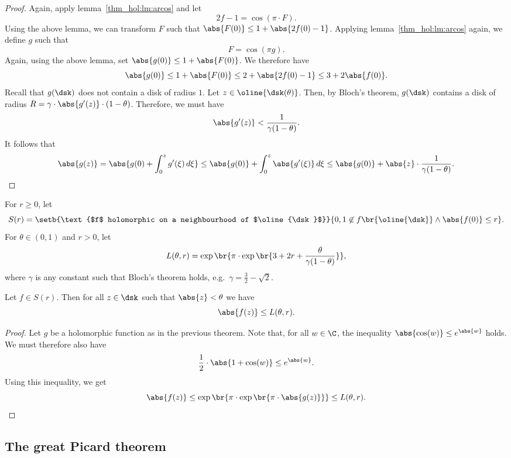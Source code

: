 \begin{proof}
Again, apply lemma~\ref{thm_hol:lm:arcos} and let
\[
2f - 1 = \cos(\pi \cdot F).
\]
Using the above lemma, we can transform $F$ such that
$\abs{F(0)} \leq 1 + \abs{2f(0) - 1}$. Applying
lemma~\ref{thm_hol:lm:arcos} again, we define $g$ such that
\[
F = \cos(\pi g).
\]
Again, using the above lemma, set $\abs{g(0)} \leq 1 + \abs{F(0)}$.
We therefore have
\[
\abs{g(0)} \leq
1 + \abs{F(0)} \leq
2 + \abs{2f(0) - 1} \leq
3 + 2 \abs{f(0)}.
\]
Recall that $g(\dsk)$ does not contain a disk of radius $1$. Let
$z \in \oline{\dsk(\theta)}$. Then, by Bloch's theorem, $g(\dsk)$
contains a disk of radius
$R = \gamma \cdot \abs{g'(z)} \cdot (1 - \theta)$. Therefore, we
must have
\[
\abs{g'(z)} < \frac{1}{\gamma (1 - \theta)}.
\]
It follows that
\[
\abs{g(z)} =
\abs{g(0) + \int_0^z g'(\xi)\,d\xi} \leq
\abs{g(0)} + \int_0^z \abs{g'(\xi)}\,d\xi \leq
\abs{g(0)} + \abs{z} \cdot \frac{1}{\gamma (1 - \theta)}. \qedhere
\]
\end{proof}

\begin{definicija}
For $r \geq 0$, let
\[
S(r) =
\setb{\text{$f$ holomorphic on a neighbourhood of $\oline{\dsk}$}}
{0, 1 \not \in f \br{\oline{\dsk}} \land \abs{f(0)} \leq r}.
\]
For $\theta \in (0, 1)$ and $r > 0$, let
\[
L(\theta, r) =
\exp \br{\pi \cdot
\exp \br{3 + 2r + \frac{\theta}{\gamma (1 - \theta)}}},
\]
where $\gamma$ is any constant such that Bloch's theorem holds,
e.g.~$\gamma = \frac{3}{2} - \sqrt{2}$.
\end{definicija}

\begin{izrek}[Schottky]
Let $f \in S(r)$. Then for all $z \in \dsk$ such that
$\abs{z} < \theta$ we have
\[
\abs{f(z)} \leq L(\theta, r).
\]
\end{izrek}

\begin{proof}
Let $g$ be a holomorphic function as in the previous theorem. Note
that, for all $w \in \C$, the inequality
$\abs{\cos(w)} \leq e^{\abs{w}}$ holds. We must therefore also have
\[
\frac{1}{2} \cdot \abs{1 + \cos(w)} \leq e^{\abs{w}}.
\]
Using this inequality, we get
\[
\abs{f(z)} \leq
\exp \br{\pi \cdot \exp \br{\pi \cdot \abs{g(z)}}} \leq
L(\theta, r). \qedhere
\]
\end{proof}

\newpage

\subsection{The great Picard theorem}

